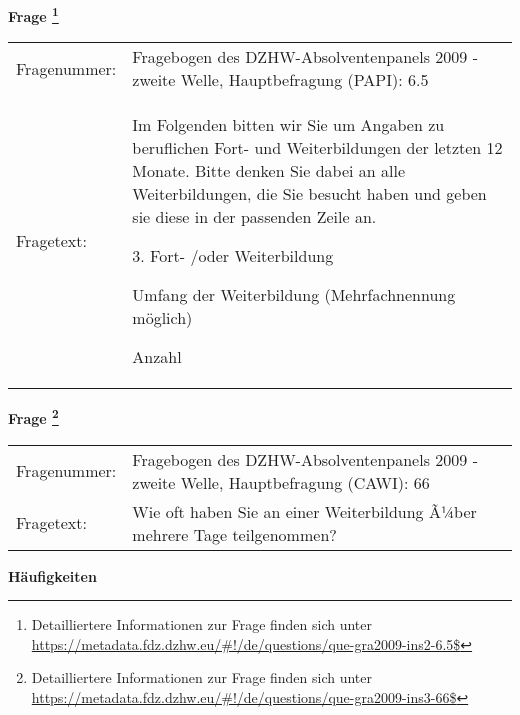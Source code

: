 				\vspace*{0.5cm}
                \noindent\textbf{Frage
	                \footnote{Detailliertere Informationen zur Frage finden sich unter
		              \url{https://metadata.fdz.dzhw.eu/\#!/de/questions/que-gra2009-ins2-6.5$}}}\\
				\begin{tabularx}{\hsize}{@{}lX}
					Fragenummer: &
					  Fragebogen des DZHW-Absolventenpanels 2009 - zweite Welle, Hauptbefragung (PAPI):
					  6.5
 \\
					Fragetext: & Im Folgenden bitten wir Sie um Angaben zu beruflichen Fort- und Weiterbildungen der letzten 12 Monate. Bitte denken Sie dabei an alle Weiterbildungen, die Sie besucht haben und geben sie diese in der passenden Zeile an.\par  3. Fort- /oder Weiterbildung\par  Umfang der Weiterbildung (Mehrfachnennung möglich)\par  Anzahl \\
				\end{tabularx}
				\vspace*{0.5cm}
                \noindent\textbf{Frage
	                \footnote{Detailliertere Informationen zur Frage finden sich unter
		              \url{https://metadata.fdz.dzhw.eu/\#!/de/questions/que-gra2009-ins3-66$}}}\\
				\begin{tabularx}{\hsize}{@{}lX}
					Fragenummer: &
					  Fragebogen des DZHW-Absolventenpanels 2009 - zweite Welle, Hauptbefragung (CAWI):
					  66
 \\
					Fragetext: & Wie oft haben Sie an einer Weiterbildung Ã¼ber mehrere Tage teilgenommen? \\
				\end{tabularx}





        		\vspace*{0.5cm}
                \noindent\textbf{Häufigkeiten}

